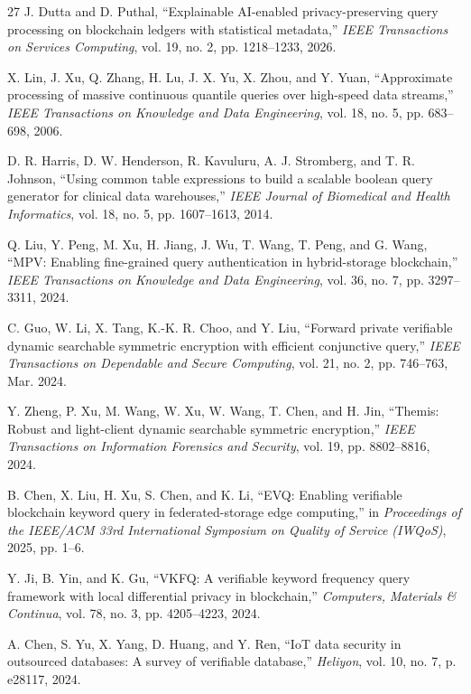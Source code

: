 \begin{thebibliography}{27}
 J. Dutta and D. Puthal, ``Explainable AI-enabled privacy-preserving query processing on blockchain ledgers with statistical metadata,'' \emph{IEEE Transactions on Services Computing}, vol. 19, no. 2, pp. 1218--1233, 2026.

 X. Lin, J. Xu, Q. Zhang, H. Lu, J. X. Yu, X. Zhou, and Y. Yuan, ``Approximate processing of massive continuous quantile queries over high-speed data streams,'' \emph{IEEE Transactions on Knowledge and Data Engineering}, vol. 18, no. 5, pp. 683--698, 2006.

 D. R. Harris, D. W. Henderson, R. Kavuluru, A. J. Stromberg, and T. R. Johnson, ``Using common table expressions to build a scalable boolean query generator for clinical data warehouses,'' \emph{IEEE Journal of Biomedical and Health Informatics}, vol. 18, no. 5, pp. 1607--1613, 2014.

 Q. Liu, Y. Peng, M. Xu, H. Jiang, J. Wu, T. Wang, T. Peng, and G. Wang, ``MPV: Enabling fine-grained query authentication in hybrid-storage blockchain,'' \emph{IEEE Transactions on Knowledge and Data Engineering}, vol. 36, no. 7, pp. 3297--3311, 2024.

 C. Guo, W. Li, X. Tang, K.-K. R. Choo, and Y. Liu, ``Forward private verifiable dynamic searchable symmetric encryption with efficient conjunctive query,'' \emph{IEEE Transactions on Dependable and Secure Computing}, vol. 21, no. 2, pp. 746--763, Mar. 2024.

 Y. Zheng, P. Xu, M. Wang, W. Xu, W. Wang, T. Chen, and H. Jin, ``Themis: Robust and light-client dynamic searchable symmetric encryption,'' \emph{IEEE Transactions on Information Forensics and Security}, vol. 19, pp. 8802--8816, 2024.

 B. Chen, X. Liu, H. Xu, S. Chen, and K. Li, ``EVQ: Enabling verifiable blockchain keyword query in federated-storage edge computing,'' in \emph{Proceedings of the IEEE/ACM 33rd International Symposium on Quality of Service (IWQoS)}, 2025, pp. 1--6.

 Y. Ji, B. Yin, and K. Gu, ``VKFQ: A verifiable keyword frequency query framework with local differential privacy in blockchain,'' \emph{Computers, Materials \& Continua}, vol. 78, no. 3, pp. 4205--4223, 2024.

 A. Chen, S. Yu, X. Yang, D. Huang, and Y. Ren, ``IoT data security in outsourced databases: A survey of verifiable database,'' \emph{Heliyon}, vol. 10, no. 7, p. e28117, 2024.


\end{thebibliography}
